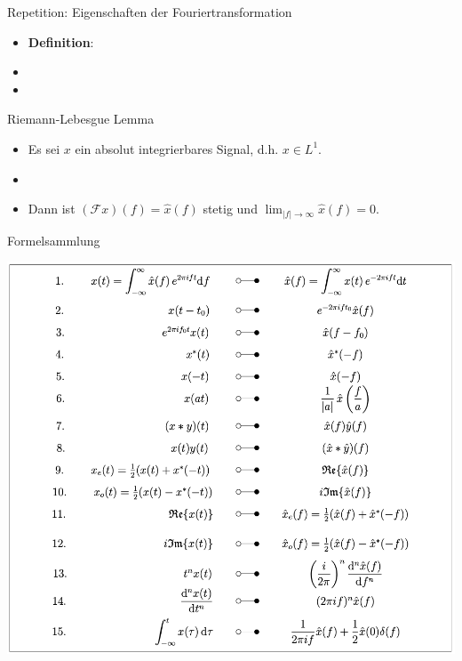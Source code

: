 \documentclass[14pt, aspectratio=169, handout]{beamer}
\begin{document}
\begin{frame}{Repetition: Eigenschaften der Fouriertransformation}
    \begin{itemize}
        \item \textbf{Definition}:
        \item[] 
        \item[] %
    \end{itemize}
\end{frame}

\begin{frame}{Riemann-Lebesgue Lemma}
    \begin{itemize}
        \item Es sei $x$ ein absolut integrierbares Signal, d.h. $x \in L^1$.
        \item[] 
        \item[]  Dann ist $(\mathcal{F}x)(f) = \hat{x}(f)$ stetig und $\displaystyle\lim_{|f| \to \infty} \hat{x}(f) = 0$.
    \end{itemize}
\end{frame}

\begin{frame}{Formelsammlung}
    \begin{center}
        \vspace*{-0.25cm}
        \includegraphics[width=0.6\linewidth]{figures/FT_eigenschaften.png}
    \end{center}
\end{frame}
\end{document}
